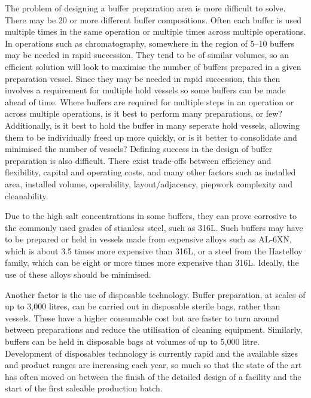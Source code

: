 The problem of designing a buffer preparation area is more difficult to solve.
There may be 20 or more different buffer compositions.  Often each buffer is
used multiple times in the same operation or multiple times across multiple
operations.  In operations such as chromatography, somewhere in the region of
5--10 buffers may be needed in rapid succession.  They tend to be of similar 
volumes, so an efficient solution will look to maximise the number of buffers
prepared in a given preparation vessel.  Since they may be needed in rapid
succession, this then involves a requirement for multiple hold vessels so
some buffers can be made ahead of time.  Where buffers are required for multiple
steps in an operation or across multiple operations, is it best to perform
many preparations, or few?  Additionally, is it best to hold the buffer
in many seperate hold vessels, allowing them to be individually freed up more
quickly, or is it better to consolidate and minimised the number of vessels?
Defining success in the design of buffer preparation is also difficult.
There exist trade-offs between efficiency and flexibility, capital and 
operating costs, and many other factors such as installed area, installed 
volume, operability, layout/adjacency, piepwork complexity and cleanability.

Due to the high salt concentrations in some buffers, they can prove corrosive
to the commonly used grades of stianless steel, such as 316L.  Such buffers
may have to be prepared or held in vessels made from expensive alloys such as
AL-6XN\textsuperscript{\textregistered}, which is about 3.5 times more
expensive than 316L, or a steel from the
Hastelloy\textsuperscript{\textregistered} family, which can be eight or more
times more expensive than 316L.
Ideally, the use of these alloys should be minimised.

Another factor is the use of disposable technology.  Buffer preparation, at
scales of up to 3,000 litres, can be carried out in disposable sterile bags,
rather than vessels.  These have a higher consumable cost but are faster to turn
around between preparations and reduce the utilisation of cleaning equipment.
Similarly, buffers can be held in disposable bags at volumes of up to 5,000
litre.  Development of disposables technology is currently rapid and the
available sizes and product ranges are increasing each year, so much so that 
the state of the art has often moved on between the finish of the detailed
design of a facility and the start of the first saleable production batch.

